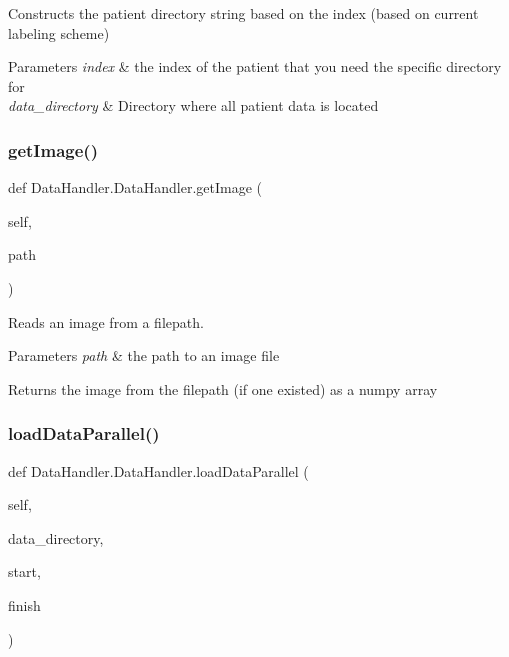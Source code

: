 Constructs the patient directory string based on the index (based on current labeling scheme) 


\begin{DoxyParams}{Parameters}
{\em index} & the index of the patient that you need the specific directory for \\
\hline
{\em data\+\_\+directory} & Directory where all patient data is located \\
\hline
\end{DoxyParams}
\mbox{\label{classDataHandler_1_1DataHandler_a450a64dad593d331764744b305818d0d}} 
\subsubsection{\texorpdfstring{get\+Image()}{getImage()}}
{\footnotesize\ttfamily def Data\+Handler.\+Data\+Handler.\+get\+Image (\begin{DoxyParamCaption}\item[{}]{self,  }\item[{}]{path }\end{DoxyParamCaption})}



Reads an image from a filepath. 


\begin{DoxyParams}{Parameters}
{\em path} & the path to an image file \\
\hline
\end{DoxyParams}
\begin{DoxyReturn}{Returns}
the image from the filepath (if one existed) as a numpy array 
\end{DoxyReturn}
\mbox{\label{classDataHandler_1_1DataHandler_a88c08a978b49e86c4a4def7b781cb6c2}} 
\subsubsection{\texorpdfstring{load\+Data\+Parallel()}{loadDataParallel()}}
{\footnotesize\ttfamily def Data\+Handler.\+Data\+Handler.\+load\+Data\+Parallel (\begin{DoxyParamCaption}\item[{}]{self,  }\item[{}]{data\+\_\+directory,  }\item[{}]{start,  }\item[{}]{finish }\end{DoxyParamCaption})}



